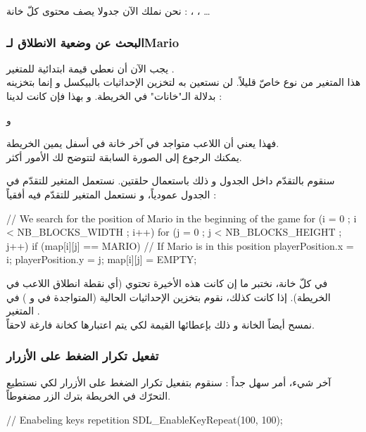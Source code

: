 نحن نملك الآن جدولا
يصف محتوى كلّ خانة : 
، ، \dots

\subsubsection{البحث عن وضعية الانطلاق لـ\textenglish{Mario}}

يجب الآن أن نعطي قيمة ابتدائية للمتغير
.\\
هذا المتغير من نوع
خاصّ قليلاً. لن نستعين به لتخزين الإحداثيات بالبيكسل و إنما بتخزينه بدلالة الـ"خانات" في الخريطة. و بهذا فإن كانت لدينا :

و

فهذا يعني أن اللاعب متواجد في آخر خانة في أسفل يمين الخريطة.\\
يمكنك الرجوع إلى الصورة السابقة لتتوضح لك الأمور أكثر.

سنقوم بالتقدّم داخل الجدول
و ذلك باستعمال حلقتين. نستعمل المتغير
للتقدّم في الجدول عمودياً، و نستعمل المتغير
للتقدّم فيه أفقياً :

\begin{Csource}
// We search for the position of Mario in the beginning of the game
for (i = 0 ; i < NB_BLOCKS_WIDTH ; i++)
{
	for (j = 0 ; j < NB_BLOCKS_HEIGHT ; j++)
	{
		if (map[i][j] == MARIO) // If Mario is in this position
		{
			playerPosition.x = i;
			playerPosition.y = j;
			map[i][j] = EMPTY;
		}
	}
}
\end{Csource}

في كلّ خانة، نختبر ما إن كانت هذه الأخيرة تحتوي
(أي نقطة انطلاق اللاعب في الخريطة). إذا كانت كذلك، نقوم بتخزين الإحداثيات الحالية (المتواجدة في 
و
)
في المتغير
.\\
نمسح أيضاً الخانة و ذلك بإعطائها القيمة
لكي يتم اعتبارها كخانة فارغة لاحقاً.

\subsubsection{تفعيل تكرار الضغط على الأزرار}

آخر شيء، أمر سهل جداً : سنقوم بتفعيل تكرار الضغط على الأزرار لكي نستطيع التحرّك في الخريطة بترك الزر مضغوطاً.

\begin{Csource}
// Enabeling keys repetition
SDL_EnableKeyRepeat(100, 100);
\end{Csource}

